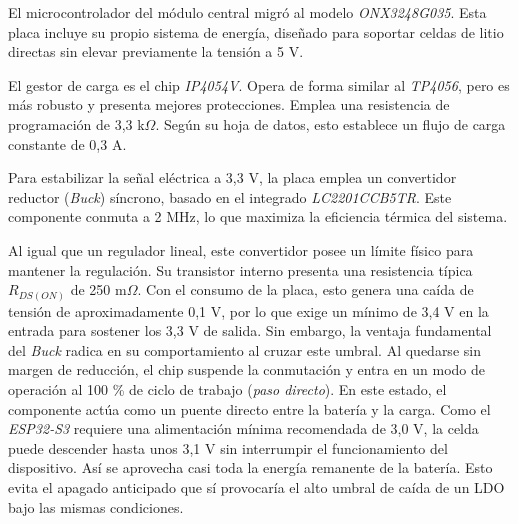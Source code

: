 El microcontrolador del módulo central migró al modelo \emph{ONX3248G035}. Esta placa incluye su propio sistema de energía, diseñado para soportar celdas de litio directas sin elevar previamente la tensión a 5 V.

El gestor de carga es el chip \emph{IP4054V}. Opera de forma similar al \emph{TP4056}, pero es más robusto y presenta mejores protecciones. Emplea una resistencia de programación de 3,3 k$\Omega$. Según su hoja de datos, esto establece un flujo de carga constante de 0,3 A.

Para estabilizar la señal eléctrica a 3,3 V, la placa emplea un convertidor reductor (\emph{Buck}) síncrono, basado en el integrado \emph{LC2201CCB5TR}. Este componente conmuta a 2 MHz, lo que maximiza la eficiencia térmica del sistema. 

Al igual que un regulador lineal, este convertidor posee un límite físico para mantener la regulación. Su transistor interno presenta una resistencia típica $R_{DS(ON)}$ de 250 m$\Omega$. Con el consumo de la placa, esto genera una caída de tensión de aproximadamente 0,1 V, por lo que exige un mínimo de 3,4 V en la entrada para sostener los 3,3 V de salida. Sin embargo, la ventaja fundamental del \emph{Buck} radica en su comportamiento al cruzar este umbral. Al quedarse sin margen de reducción, el chip suspende la conmutación y entra en un modo de operación al 100 \% de ciclo de trabajo (\emph{paso directo}). En este estado, el componente actúa como un puente directo entre la batería y la carga. Como el \emph{ESP32-S3} requiere una alimentación mínima recomendada de 3,0 V, la celda puede descender hasta unos 3,1 V sin interrumpir el funcionamiento del dispositivo. Así se aprovecha casi toda la energía remanente de la batería. Esto evita el apagado anticipado que sí provocaría el alto umbral de caída de un LDO bajo las mismas condiciones.

